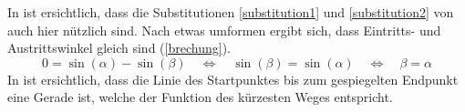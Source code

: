 In  ist ersichtlich, dass die Substitutionen \ref{substitution1} und \ref{substitution2} von  auch hier nützlich sind.
Nach etwas umformen ergibt sich, dass Eintritts- und Austrittswinkel gleich sind (\eqref{brechung}).
\begin{equation}
0 = \sin(\alpha) - \sin(\beta) \quad \Leftrightarrow \quad \sin(\beta) = \sin(\alpha) \quad \Leftrightarrow\quad \beta = \alpha
\label{brechung}
\end{equation}
In  ist ersichtlich, dass die Linie des Startpunktes bis zum 
gespiegelten Endpunkt eine Gerade ist, welche der Funktion des kürzesten Weges entspricht.